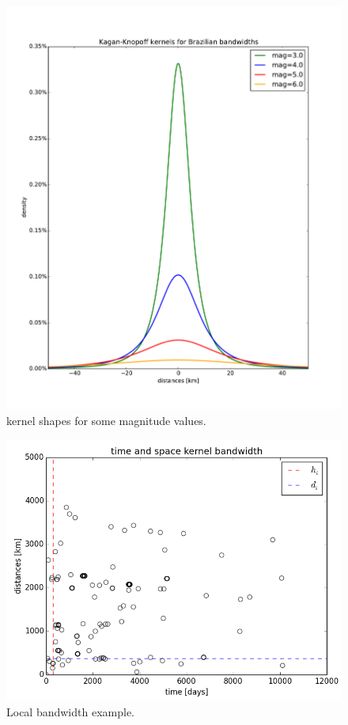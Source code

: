 \documentclass[draft, grl]{agutex}
\begin{document}
\begin{figure}
	\includegraphics[width=0.99\linewidth]{z_img_woo_kernels}
	\caption{\citet{kagan_knopoff_1980} kernel shapes for some magnitude values.}
	\label{fig_woo_kernels}
\end{figure}





\begin{figure}
	\includegraphics[width=0.99\linewidth]{z_img_helmstetter_hidi}
	\caption{Local bandwidth example.}
	\label{fig_helmstetter_hidi}
\end{figure}
\end{document}

